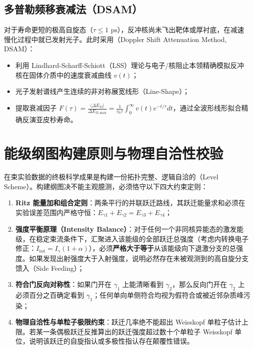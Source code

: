 \subsection{多普勒频移衰减法（DSAM）}

对于寿命更短的极高自旋态（$\tau \le 1\text{ ps}$），反冲核尚未飞出靶体或厚衬底，在减速慢化过程中就已发射光子。此时采用（Doppler Shift Attenuation Method, DSAM）：
\begin{itemize}
    \item 利用 Lindhard-Scharff-Schiott（LSS）理论与电子/核阻止本领精确模拟反冲核在固体介质中的速度衰减曲线 $v(t)$；
    \item 光子发射谱线产生连续的非对称展宽线形（Line-Shape）；
    \item 提取衰减因子 $F(\tau) = \frac{\langle \Delta E_D \rangle}{\Delta E_{D,\text{max}}} = \frac{1}{v_0 \tau} \int_0^\infty v(t) e^{-t/\tau} dt$，通过全波形线形拟合精确反演亚皮秒寿命。
\end{itemize}

\section{能级纲图构建原则与物理自洽性校验}
\label{sec:level_scheme_construction}

在束实验数据的终极科学成果是构建一份拓扑完整、逻辑自洽的（Level Scheme）。构建纲图决不能主观臆测，必须恪守以下四大约束定则：
\begin{enumerate}
    \item \textbf{Ritz 能量加和组合定则}：两条平行的并联跃迁路线，其跃迁能量求和必须在实验误差范围内严格守恒：$E_{\gamma 1} + E_{\gamma 2} = E_{\gamma 3} + E_{\gamma 4}$；
    \item \textbf{强度平衡原理（Intensity Balance）}：对于任何一个非同核异能态的激发能级，在稳定束流条件下，汇聚进入该能级的全部跃迁总强度（考虑内转换电子修正：$I_{\text{tot}} = I_\gamma (1 + \alpha)$），必须\textbf{严格大于等于}从该能级向下退激分支的总强度。如果发现出射强度大于入射强度，说明必然存在未被观测到的高自旋分支馈入（Side Feeding）；
    \item \textbf{符合门反向对称性}：如果门开在 $\gamma_1$ 上能清晰看到 $\gamma_2$，那么反向门开在 $\gamma_2$ 上必须百分之百确定看到 $\gamma_1$；任何单向单侧符合均视为假符合或被近邻杂质峰污染；
    \item \textbf{物理自洽性与单粒子极限约束}：跃迁几率绝不能超出 Weisskopf 单粒子估计上限。若某一条偶极跃迁反推算出的跃迁强度超过数十个单粒子 Weisskopf 单位，说明该跃迁的自旋指认或多极性指认存在颠覆性错误。
\end{enumerate}
